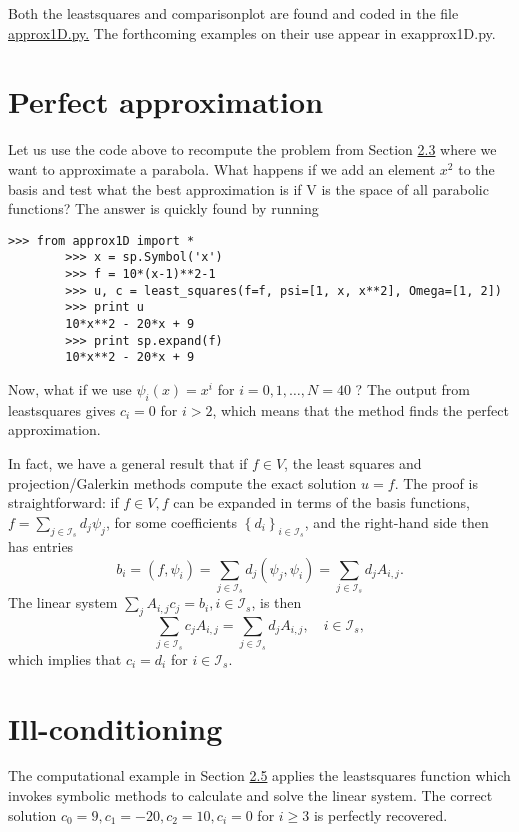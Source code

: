 \documentclass[../main.tex]{subfiles}
\begin{document}
	Both the least\textunderscore squares and comparison\textunderscore plot are found and coded in the
	file \href{http://tinyurl.com/jvzzcfn/fem/approx1D.py}{approx1D.py.} The forthcoming examples on their use appear in ex\textunderscore approx1D.py.
	\section[Perfect approximation]{Perfect approximation}
	\label{sec:sec_2_5}
	Let us use the code above to recompute the problem from Section \hyperref[sec:sec_2_3]{2.3} where we want to approximate a parabola. What happens if we add an element $x^{2}$ to the basis and test what the best approximation is if V is the space of all parabolic
	functions? The answer is quickly found by running
	\begin{lstlisting}[numbers=none]
		>>> from approx1D import *
		>>> x = sp.Symbol('x')
		>>> f = 10*(x-1)**2-1
		>>> u, c = least_squares(f=f, psi=[1, x, x**2], Omega=[1, 2])
		>>> print u
		10*x**2 - 20*x + 9
		>>> print sp.expand(f)
		10*x**2 - 20*x + 9
	\end{lstlisting}
	Now, what if we use $\psi_{i}(x)=x^{i}$ for $i=0,1, \ldots, N=40$ ? The output from least\textunderscore squares gives $c_{i}=0$ for $i>2$, which means that the method finds the perfect approximation.
	
	In fact, we have a general result that if $f \in V$, the least squares and projection/Galerkin methods compute the exact solution $u=f$. The proof is straightforward: if $f \in V, f$ can be expanded in terms of the basis functions, $f=\sum_{j \in \mathcal{I}_{s}} d_{j} \psi_{j}$, for some coefficients $\left\{d_{i}\right\}_{i \in \mathcal{I}_{s}}$, and the right-hand side then has entries
	$$
	b_{i}=\left(f, \psi_{i}\right)=\sum_{j \in \mathcal{I}_{s}} d_{j}\left(\psi_{j}, \psi_{i}\right)=\sum_{j \in \mathcal{I}_{s}} d_{j} A_{i, j}.
	$$
	The linear system $\sum_{j} A_{i, j} c_{j}=b_{i}, i \in \mathcal{I}_{s}$, is then
	$$
	\sum_{j \in \mathcal{I}_{s}} c_{j} A_{i, j}=\sum_{j \in \mathcal{I}_{s}} d_{j} A_{i, j}, \quad i \in \mathcal{I}_{s},
	$$
	which implies that $c_{i}=d_{i}$ for $i \in \mathcal{I}_{s}$.
	\section[Ill-conditioning]{Ill-conditioning}
	\label{sec:sec_2_6}
	The computational example in Section \hyperref[sec:sec_2_5]{2.5} applies the least\textunderscore squares function which invokes symbolic methods to calculate and solve the linear system. The correct solution $c_{0}=9, c_{1}=-20, c_{2}=10, c_{i}=0$ for $i \geq 3$ is perfectly recovered.
	
\end{document}
